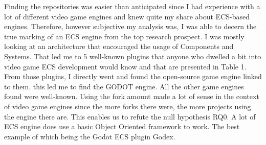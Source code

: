 \documentclass{IEEEcsmag}
\begin{document}
Finding the repositories was easier than anticipated since I had experience with a lot of different video game engines and knew quite my share about ECS-based engines. Therefore, however subjective my analysis was, I was able to decern the true marking of an ECS engine from the top research prospect. I was mostly looking at an architecture that encouraged the usage of Components and Systems. That led me to 5 well-known plugins that anyone who dwelled a bit into video game ECS development would know and that are presented in Table 1. From those plugins, I directly went and found the open-source game engine linked to them. this led me to find the GODOT engine. All the other game engines found were well-known. Using the fork amount made a lot of sense in the context of video game engines since the more forks there were, the more projects using the engine there are. This enables us to refute the null hypothesis RQ0. A lot of ECS engine does use a basic Object Oriented framework to work. The best example of which being the Godot ECS plugin Godex. 
\end{document}

